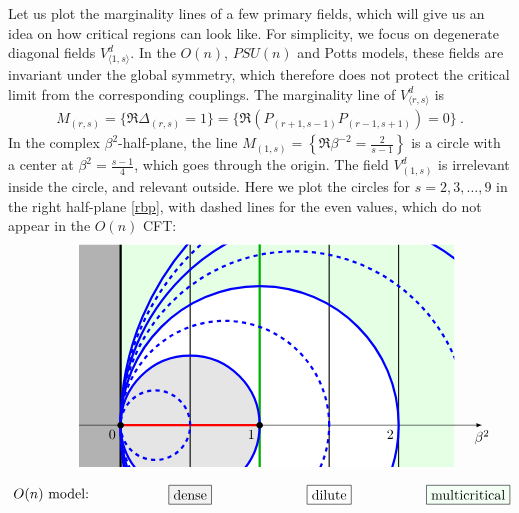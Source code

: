 \documentclass[12pt, a4paper]{article}
\begin{document}
Let us plot the marginality lines of a few primary fields, which will give us an idea on how critical regions can look like. For simplicity, we focus on degenerate diagonal fields $V^d_{\langle 1,s\rangle}$. In the $O(n)$, $PSU(n)$ and Potts models, these fields are invariant under the global symmetry, which therefore does not protect the critical limit from the corresponding couplings. The marginality line of $V^d_{\langle r,s\rangle}$ is
\begin{align}
 M_{(r,s)} = \Big\{\Re\Delta_{(r,s)} = 1 \Big\} = \Big\{\Re \left(P_{(r+1,s-1)}P_{(r-1,s+1)}\right) = 0\Big\} \ . 
\end{align}
In the complex $\beta^2$-half-plane, the line $M_{(1,s)}=\left\{\Re\beta^{-2}=\frac{2}{s-1}\right\}$ is a circle with a center at $\beta^2=\frac{s-1}{4}$, which goes through the origin. The field $V^d_{(1,s)}$ is irrelevant inside the circle, and relevant outside. Here we plot the circles for $s=2,3,\dots, 9$ in the right half-plane \eqref{rbp}, with dashed lines for the even values, which do not appear in the $O(n)$ CFT:
\begin{align}
 \begin{tikzpicture}[baseline=(current  bounding  box.center), scale = 3.5]
 \draw [-latex] (-.3, 0) -- (2.6, 0) node[below]{$\beta^2$};
 \node at (-.5, -.5) {$O(n)$ model:};
 \node[draw, fill = black!5] at (.5, -.5) {dense};
 \node[draw] at (1.5, -.5) {dilute};
 \node[draw, fill = green!5] at (2.5, -.5) {multicritical};
 \clip (-.3, -.3) -- (-.3, 1.3) -- (2.4, 1.3) -- (2.4, -.3) -- cycle;
 \fill [color = green!10] (0, -1.3) -- (2.4, -1.3) -- (2.4, 1.3) -- (0, 1.3) -- cycle;
  \fill [color = white] (1, 0) circle [radius = 1];
 \fill [color = black!10] (.5, 0) circle [radius = .5];
 \fill [color = black!30] (0, -1.3) -- (-.3, -1.3) -- (-.3, 1.3) -- (0, 1.3) -- cycle;
 \draw[ultra thick] (0, -1.3) -- (0, 1.3);
 \draw[thick] (.5, -1.3) -- (.5, 1.3);
 \draw[thick] (1, -1.3) -- (1, 1.3);
 \draw[thick] (1.5, -1.3) -- (1.5, 1.3);
 \draw[thick] (2, -1.3) -- (2, 1.3);
 \draw[ultra thick, green!70!black] (1, -1) -- (1,1.5);
  \draw [-latex] (-.3, 0) -- (0, 0) node [below left] {$0$} -- (1, 0) node [below left] {$1$} -- (2, 0) node[below left] {$2$} -- (2.6, 0);
   \draw [ultra thick, red] (0, 0) -- (1, 0); 
  \foreach \s in {2,4,6,8}{
  \draw [ultra thick, dashed, blue] ({(\s-1)/4}, 0) circle [radius = (\s-1)/4];
  \draw [ultra thick, blue] ({\s/4}, 0) circle [radius = \s/4];
  }
 \node at (1, 0) [fill, circle, scale = .5] {};
 \node at (0, 0) [fill, circle, scale = .5] {};
 \end{tikzpicture} 
 \label{phases}
\end{align}
\end{document}
